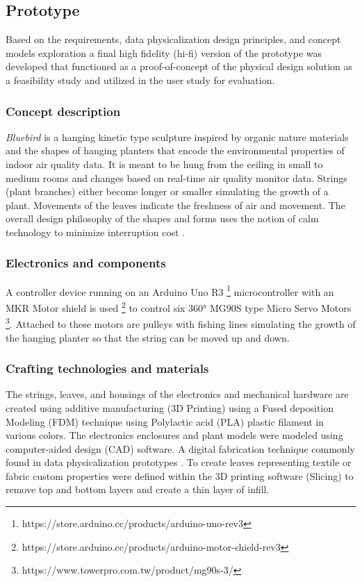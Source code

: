 \subsection{Prototype}
\label{sec:prototype_results}

Based on the requirements, data physicalization design principles, and concept models exploration a final high fidelity (hi-fi) version of the prototype was developed that functioned as a proof-of-concept of the physical design solution as a feasibility study and utilized in the user study for evaluation.

\subsubsection{Concept description}

\textit{Bluebird} is a hanging kinetic type sculpture inspired by organic nature materials and the shapes of hanging planters that encode the environmental properties of indoor air quality data. It is meant to be hung from the ceiling in small to medium rooms and changes based on real-time air quality monitor data. Strings (plant branches) either become longer or smaller simulating the growth of a plant. Movements of the leaves indicate the freshness of air and movement. The overall design philosophy of the shapes and forms uses the notion of calm technology to minimize interruption cost \cite{case_calm_2016}. 

\subsubsection{Electronics and components}

A controller device running on an Arduino Uno R3 \footnote{https://store.arduino.cc/products/arduino-uno-rev3} microcontroller with an MKR Motor shield is used \footnote{https://store.arduino.cc/products/arduino-motor-shield-rev3} to control six 360° MG90S type Micro Servo Motors \footnote{https://www.towerpro.com.tw/product/mg90s-3/}. Attached to these motors are pulleys with fishing lines simulating the growth of the hanging planter so that the string can be moved up and down.


\subsubsection{Crafting technologies and materials}
The strings, leaves, and housings of the electronics and mechanical hardware are created using additive manufacturing (3D Printing) using a Fused deposition Modeling (FDM) technique using Polylactic acid (PLA) plastic filament in various colors. The electronics enclosures and plant models were modeled using computer-aided design (CAD) software. A digital fabrication technique commonly found in data physicalization prototypes \cite{anhalt_university_germany_design_2022}. To create leaves representing textile or fabric custom properties were defined within the 3D printing software (Slicing) to remove top and bottom layers and create a thin layer of infill.

